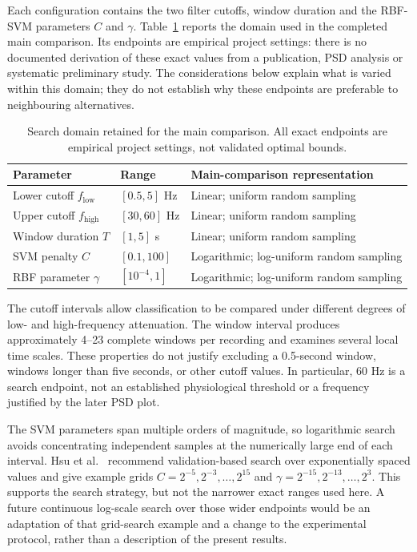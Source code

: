 Each configuration contains the two filter cutoffs, window duration and the
RBF-SVM parameters $C$ and $\gamma$. Table~\ref{tab:search-domain} reports the
domain used in the completed main comparison. Its endpoints are empirical
project settings: there is no documented derivation of these exact values
from a publication, PSD analysis or systematic preliminary study. The
considerations below explain what is varied within this domain; they do not
establish why these endpoints are preferable to neighbouring alternatives.

\begin{table}[htbp]
\centering
\caption{Search domain retained for the main comparison. All exact endpoints
are empirical project settings, not validated optimal bounds.}
\label{tab:search-domain}
\renewcommand{\arraystretch}{1.15}
\begin{tabular}{lll}
\hline
Parameter & Range & Main-comparison representation \\
\hline
Lower cutoff $f_{\mathrm{low}}$ & $[0.5,5]$ Hz & Linear; uniform random sampling \\
Upper cutoff $f_{\mathrm{high}}$ & $[30,60]$ Hz & Linear; uniform random sampling \\
Window duration $T$ & $[1,5]$ s & Linear; uniform random sampling \\
SVM penalty $C$ & $[0.1,100]$ & Logarithmic; log-uniform random sampling \\
RBF parameter $\gamma$ & $[10^{-4},1]$ & Logarithmic; log-uniform random sampling \\
\hline
\end{tabular}
\end{table}

The cutoff intervals allow classification to be compared under different
degrees of low- and high-frequency attenuation. The window interval produces
approximately 4--23 complete windows per recording and examines several local
time scales. These properties do not justify excluding a 0.5-second window,
windows longer than five seconds, or other cutoff values. In particular,
60 Hz is a search endpoint, not an established physiological threshold or
a frequency justified by the later PSD plot.

The SVM parameters span multiple orders of magnitude, so logarithmic search
avoids concentrating independent samples at the numerically large end of
each interval. Hsu et al.~\cite{HsuSVMGuide} recommend validation-based search
over exponentially spaced values and give example grids
$C=2^{-5},2^{-3},\ldots,2^{15}$ and
$\gamma=2^{-15},2^{-13},\ldots,2^3$.
This supports the search strategy, but not the narrower exact ranges used
here. A future continuous log-scale search over those wider endpoints would
be an adaptation of that grid-search example and a change to the experimental
protocol, rather than a description of the present results.

